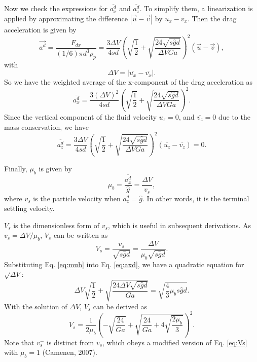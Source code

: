 \documentclass[12pt,a4paper]{article}
\begin{document}
Now we check the expressions for $\overline{a_{x}^d}$ and $\overline{a_{z}^d}$. To simplify them, a linearization is applied by approximating the difference $|\vec{u} - \vec{v}|$ by $\overline{u_x} - \overline{v_x}$. Then the drag acceleration is given by
\begin{equation}
    \vec{a^d} = \frac{F_{dx}}{(1/6)\pi d^3 \rho_p} = \frac{3 \Delta V}{4s d} \left(\sqrt{\frac{1}{2}} + \sqrt{\frac{24 \sqrt{s \hat{g} d}}{\Delta V Ga}} \right)^2 \left(\vec{u} - \vec{v}\right),
\end{equation}
with
\begin{equation}
    \Delta V = |\overline{u_x} - \overline{v_x}|.
\end{equation}
So we have the weighted average of the x-component of the drag acceleration as
\begin{equation}
    \overline{a_{x}^d} = \frac{3 (\Delta V)^2}{4s d} \left(\sqrt{\frac{1}{2}} + \sqrt{\frac{24 \sqrt{s \hat{g} d}}{\Delta V Ga}} \right)^2 \label{eq:axd}.
\end{equation}
Since the vertical component of the fluid velocity $u_z = 0$, and $\overline{v_z} = 0$ due to the mass conservation, we have
\begin{equation}
    \overline{a_{z}^d} = \frac{3 \Delta V}{4s d} \left(\sqrt{\frac{1}{2}} + \sqrt{\frac{24 \sqrt{s \hat{g} d}}{\Delta V Ga}} \right)^2 (\overline{u_z} - \overline{v_z}) = 0.
\end{equation}

Finally, $\mu_b$ is given by
\begin{equation}
    \mu_b = \frac{\overline{a_{x}^d}}{\hat{g}} = \frac{\Delta V}{v_s} \label{eq:mub},
\end{equation}
where $v_s$ is the particle velocity when $a_z^d = \hat{g}$. In other words, it is the terminal settling velocity.

$V_s$ is the dimensionless form of $v_s$, which is useful in subsequent derivations. As $v_s = \Delta V / \mu_b$, $V_s$ can be written as
\begin{equation}
    V_s = \frac{v_s}{\sqrt{s \hat{g} d}} = \frac{\Delta V}{\mu_b \sqrt{s \hat{g} d}}.
\end{equation}
Substituting Eq. \ref{eq:mub} into Eq. \ref{eq:axd}, we have a quadratic equation for $\sqrt{\Delta V}$:
\begin{equation}
    \Delta V \sqrt{\frac{1}{2}} + \sqrt{\frac{24 \Delta V \sqrt{s \hat{g} d}}{Ga}} = \sqrt{\frac{4}{3} \mu_b s \hat{g} d}.
\end{equation}
With the solution of $\Delta V$, $V_s$ can be derived as
\begin{equation}
    {V_s = \frac{1}{2\mu_b} \left( -\sqrt{\frac{24}{Ga}} + \sqrt{\frac{24}{Ga} + 4\sqrt{\frac{2\mu_b}{3}}} \right)^2 \label{eq:Vs}}.
\end{equation}
Note that $v_s^-$ is distinct from $v_s$, which obeys a modified version of Eq. \ref{eq:Vs} with $\mu_b = 1$ (Camenen, 2007).
\end{document}

